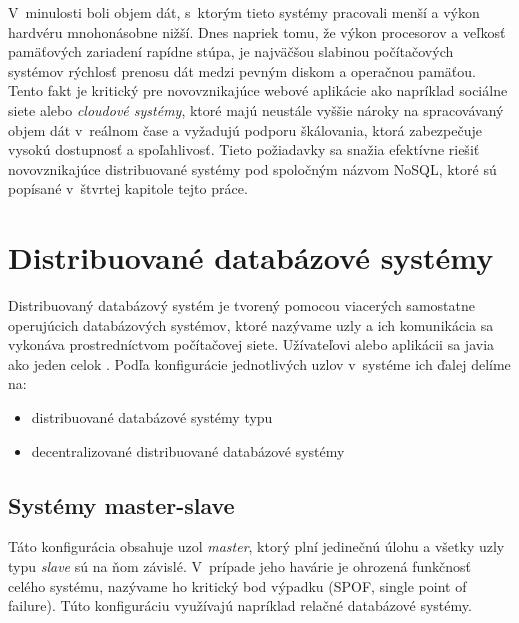 \documentclass[11pt,twoside,a4paper]{book}
\begin{document}
V~minulosti boli objem dát, s~ktorým tieto systémy pracovali menší a výkon hardvéru mnohonásobne nižší. Dnes napriek tomu, že výkon procesorov a veľkosť pamäťových zariadení rapídne stúpa, je najväčšou slabinou počítačových systémov rýchlosť prenosu dát medzi pevným diskom a operačnou pamäťou. Tento fakt je kritický pre novovznikajúce webové aplikácie ako napríklad sociálne siete alebo \emph{cloudové systémy}, ktoré majú neustále vyššie nároky na spracovávaný objem dát v~reálnom čase a vyžadujú podporu škálovania, ktorá zabezpečuje vysokú dostupnosť a spoľahlivosť. Tieto požiadavky sa snažia efektívne riešiť novovznikajúce distribuované systémy pod spoločným názvom NoSQL, ktoré sú popísané v~štvrtej kapitole tejto práce. %


\section{Distribuované databázové systémy}
Distribuovaný databázový systém je tvorený pomocou viacerých samostatne operujúcich databázových systémov, ktoré nazývame uzly a ich komunikácia sa vykonáva prostredníctvom počítačovej siete. Užívateľovi alebo aplikácii sa javia ako jeden celok \cite{hewitt2010cassandra}. Podľa konfigurácie jednotlivých uzlov v~systéme ich ďalej delíme na:
\begin{itemize}
 \item distribuované databázové systémy typu 
 \item decentralizované distribuované databázové systémy
\end{itemize}

\subsection*{Systémy master-slave} 

Táto konfigurácia obsahuje uzol \emph{master}, ktorý plní jedinečnú úlohu a všetky uzly typu \emph{slave} sú na ňom závislé. V~prípade jeho havárie je ohrozená funkčnosť celého systému, nazývame ho kritický bod výpadku (SPOF, single point of failure). Túto konfiguráciu využívajú napríklad relačné databázové systémy.
\end{document}
